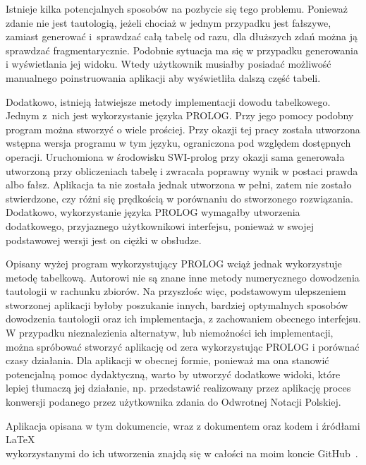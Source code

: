\documentclass{SGGW-thesis}
\begin{document}
\begin{paragraph}{}
    Istnieje kilka potencjalnych sposobów na pozbycie się tego problemu. Ponieważ zdanie nie jest tautologią, jeżeli chociaż w jednym przypadku jest fałszywe, zamiast generować i~sprawdzać całą tabelę od razu, dla dłuższych zdań można ją sprawdzać fragmentarycznie. Podobnie sytuacja ma się w przypadku generowania i wyświetlania jej widoku. Wtedy użytkownik musiałby posiadać możliwość manualnego poinstruowania aplikacji aby wyświetliła dalszą część tabeli.

    Dodatkowo, istnieją łatwiejsze metody implementacji dowodu tabelkowego. Jednym z~nich jest wykorzystanie języka PROLOG. Przy jego pomocy podobny program można stworzyć  o wiele prościej. Przy okazji tej pracy została utworzona wstępna wersja programu w tym języku, ograniczona pod względem dostępnych operacji. Uruchomiona w środowisku SWI-prolog przy okazji sama generowała utworzoną przy obliczeniach tabelę i zwracała poprawny wynik w postaci prawda albo fałsz. Aplikacja ta nie została jednak utworzona w pełni, zatem nie zostało stwierdzone, czy różni się prędkością w porównaniu do stworzonego rozwiązania. Dodatkowo, wykorzystanie języka PROLOG wymagałby utworzenia dodatkowego, przyjaznego użytkownikowi interfejsu, ponieważ w swojej podstawowej wersji jest on ciężki w obsłudze.

    Opisany wyżej program wykorzystujący PROLOG wciąż jednak wykorzystuje metodę tabelkową. Autorowi nie są znane inne metody numerycznego dowodzenia tautologii w rachunku zbiorów. Na przyszłośc więc, podstawowym ulepszeniem stworzonej aplikacji byłoby poszukanie innych, bardziej optymalnych sposobów dowodzenia tautologii oraz ich implementacja, z zachowaniem obecnego interfejsu. W przypadku nieznalezienia alternatyw, lub niemożności ich implementacji, można spróbować stworzyć aplikację od zera wykorzystując PROLOG i porównać czasy działania. Dla aplikacji w obecnej formie, ponieważ ma ona stanowić potencjalną pomoc dydaktyczną, warto by utworzyć dodatkowe widoki, które lepiej tłumaczą jej działanie, np. przedstawić realizowany przez aplikację proces konwersji podanego przez użytkownika zdania do Odwrotnej Notacji Polskiej.

    Aplikacja opisana w tym dokumencie, wraz z dokumentem oraz kodem i źródłami \LaTeX \\wykorzystanymi do ich utworzenia znajdą się w całości na moim koncie GitHub~\cite{github:aglebionek}.
\end{paragraph}


\nocite{*} %




\beforelastpage
\end{document}

